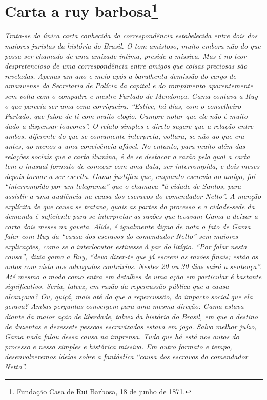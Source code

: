 \chapter{Carta a ruy barbosa\footnote{Fundação Casa de Rui Barbosa, 18 de junho de 1871.}}%

\begin{didascalia}
\emph{Trata-se da única carta conhecida da correspondência estabelecida
entre dois dos maiores juristas da história do Brasil. O tom amistoso,
muito embora não do que possa ser chamado de uma amizade íntima, preside
a missiva. Mas é no teor despretencioso de uma correspondência entre
amigos que coisas preciosas são reveladas. Apenas um ano e meio após a
barulhenta demissão do cargo de amanuense da Secretaria de Polícia da
capital e do rompimento aparentemente sem volta com o compadre e mestre
Furtado de Mendonça, Gama contava a Ruy o que parecia ser uma cena
corriqueira. ``Estive, há dias, com o conselheiro Furtado, que falou de
ti com muito elogio. Cumpre notar que ele não é muito dado a dispensar
louvores''. O relato simples e direto sugere que a relação entre ambos,
diferente do que se comumente interpreta, voltara, se não ao que era
antes, ao menos a uma convivência afável. No entanto, para muito além
das relações sociais que a carta ilumina, é de se destacar a razão pela
qual a carta tem o inusual formato de começar com uma data, ser
interrompida, e dois meses depois tornar a ser escrita. Gama justifica
que, enquanto escrevia ao amigo, foi ``interrompido por um telegrama'' que
o chamava ``à cidade de Santos, para assistir a uma audiência na causa
dos escravos do comendador Netto''. A menção explícita de que causa se
tratava, quais as partes do processo e a cidade-sede da demanda é
suficiente para se interpretar as razões que levavam Gama a deixar a
carta dois meses na gaveta. Aliás, é igualmente digno de nota o fato de
Gama falar com Ruy da ``causa dos escravos do comendador Netto'' sem
maiores explicações, como se o interlocutor estivesse à par do litígio.
``Por falar nesta causa'', dizia gama a Ruy, ``devo dizer-te que já escrevi
as razões finais; estão os autos com vista aos advogados contrários.
Nestes 20 ou 30 dias sairá a sentença''. Até mesmo o modo como entra em
detalhes de uma ação em particular é bastante significativo. Seria,
talvez, em razão da repercussão pública que a causa alcançava? Ou,
quiçá, mais até do que a repercussão, do impacto social que ela gerava?
Ambas perguntas convergem para uma mesma direção: Gama estava diante da
maior ação de liberdade, talvez da história do Brasil, em que o destino
de duzentas e dezessete pessoas escravizadas estava em jogo. Salvo
melhor juízo, Gama nada falou dessa causa na imprensa. Tudo que há está
nos autos do processo e nessa simples e histórica missiva. Em outro
formato e tempo, desenvolveremos ideias sobre a fantástica ``causa dos
escravos do comendador Netto''.}
\end{didascalia}

